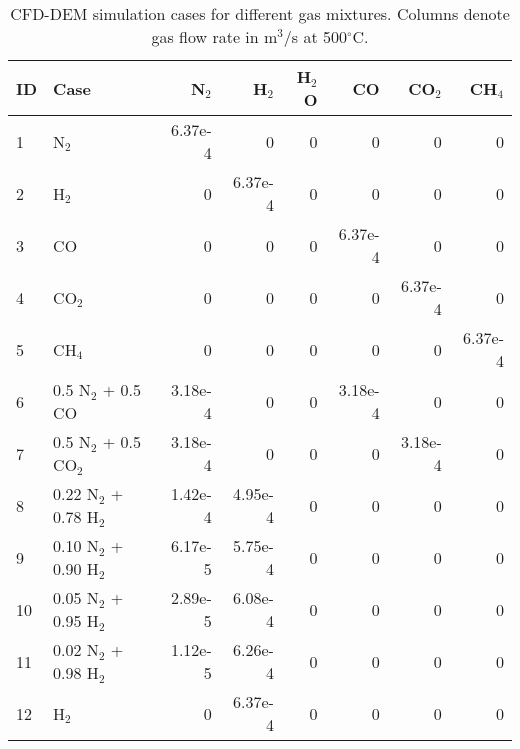 
\begin{table}[H]
    \centering
    \caption{CFD-DEM simulation cases for different gas mixtures. Columns denote gas flow rate in m$^3$/s at 500$^\circ$C.}
    \begin{tabular}{llrrrrrr}
        \toprule
        ID & Case                    & N$_2$    & H$_2$   & H$_2$O   & CO      & CO$_2$   & CH$_4$  \\
        \midrule
        1  & N$_2$                   & 6.37e-4  & 0       & 0        & 0       & 0        & 0       \\
        2  & H$_2$                   & 0        & 6.37e-4 & 0        & 0       & 0        & 0       \\
        3  & CO                      & 0        & 0       & 0        & 6.37e-4 & 0        & 0       \\
        4  & CO$_2$                  & 0        & 0       & 0        & 0       & 6.37e-4  & 0       \\
        5  & CH$_4$                  & 0        & 0       & 0        & 0       & 0        & 6.37e-4 \\
        6  & 0.5 N$_2$ + 0.5 CO      & 3.18e-4  & 0       & 0        & 3.18e-4 & 0        & 0       \\
        7  & 0.5 N$_2$ + 0.5 CO$_2$  & 3.18e-4  & 0       & 0        & 0       & 3.18e-4  & 0       \\
        8  & 0.22 N$_2$ + 0.78 H$_2$ & 1.42e-4  & 4.95e-4 & 0        & 0       & 0        & 0       \\
        9  & 0.10 N$_2$ + 0.90 H$_2$ & 6.17e-5  & 5.75e-4 & 0        & 0       & 0        & 0       \\
        10 & 0.05 N$_2$ + 0.95 H$_2$ & 2.89e-5  & 6.08e-4 & 0        & 0       & 0        & 0       \\
        11 & 0.02 N$_2$ + 0.98 H$_2$ & 1.12e-5  & 6.26e-4 & 0        & 0       & 0        & 0       \\
        12 & H$_2$                   & 0        & 6.37e-4 & 0        & 0       & 0        & 0       \\
        \bottomrule
    \end{tabular}
    \label{tab:flowrates}
\end{table}

